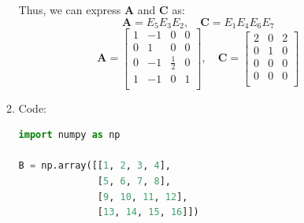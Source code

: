 \documentclass[11pt,letterpaper]{article}
\begin{document}
\begin{enumerate}
\begin{enumerate}
\[    \]
    Thus, we can express $\mathbf{A}$ and $\mathbf{C}$ as:
    \[
        \mathbf{A} = E_5E_3E_2, \quad \mathbf{C} = E_1E_4E_6E_7
    \]
    \[
        \mathbf{A} = \begin{bmatrix}
            1 & -1 & 0 & 0\\
            0 & 1 & 0 & 0\\
            0 & -1 & \frac{1}{2} & 0\\
            1 & -1 & 0 & 1\\
        \end{bmatrix}, \quad
        \mathbf{C} = \begin{bmatrix}
            2 & 0 & 2\\
            0 & 1 & 0\\
            0 & 0 & 0\\
            0 & 0 & 0\\
        \end{bmatrix}
    \]
    \item Code:
\begin{lstlisting}[language=python]
import numpy as np

B = np.array([[1, 2, 3, 4],
              [5, 6, 7, 8],
              [9, 10, 11, 12],
              [13, 14, 15, 16]])


\end{lstlisting}
\end{enumerate}
\end{enumerate}
\end{document}

